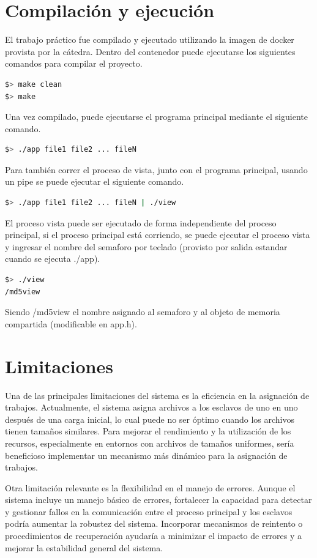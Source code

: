 \documentclass{article}
\begin{document}
\section{Compilación y ejecución}

El trabajo práctico fue compilado y ejecutado utilizando la imagen de docker provista por la cátedra. Dentro del contenedor puede ejecutarse los siguientes comandos para compilar el proyecto.

\begin{lstlisting}[language=bash]
$> make clean
$> make
\end{lstlisting}
Una vez compilado, puede ejecutarse el programa principal mediante el siguiente comando.

\begin{lstlisting}[language=bash]
$> ./app file1 file2 ... fileN
\end{lstlisting}
Para también correr el proceso de vista, junto con el programa principal, usando un pipe se puede ejecutar el siguiente comando.
\begin{lstlisting}[language=bash]
$> ./app file1 file2 ... fileN | ./view
\end{lstlisting}
El proceso vista puede ser ejecutado de forma independiente del proceso principal, si el proceso principal está corriendo, se puede ejecutar el proceso vista y ingresar el nombre del semaforo  por teclado (provisto por salida estandar cuando se ejecuta ./app).
\begin{lstlisting}[language=bash]
$> ./view
/md5view
\end{lstlisting}
Siendo /md5view el nombre asignado al semaforo y al objeto de memoria compartida (modificable en app.h).

\section{Limitaciones}

Una de las principales limitaciones del sistema es la eficiencia en la asignación de trabajos. Actualmente, el sistema asigna archivos a los esclavos de uno en uno después de una carga inicial, lo cual puede no ser óptimo cuando los archivos tienen tamaños similares. Para mejorar el rendimiento y la utilización de los recursos, especialmente en entornos con archivos de tamaños uniformes, sería beneficioso implementar un mecanismo más dinámico para la asignación de trabajos.

Otra limitación relevante es la flexibilidad en el manejo de errores. Aunque el sistema incluye un manejo básico de errores, fortalecer la capacidad para detectar y gestionar fallos en la comunicación entre el proceso principal y los esclavos podría aumentar la robustez del sistema. Incorporar mecanismos de reintento o procedimientos de recuperación ayudaría a minimizar el impacto de errores y a mejorar la estabilidad general del sistema.
\end{document}
